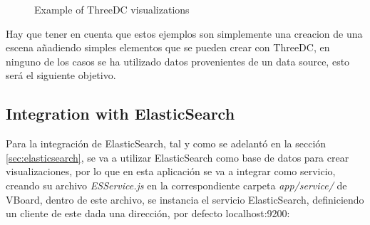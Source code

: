 \documentclass[a4paper, 12pt]{book}
\begin{document}
\begin{figure}[H]
 \centering
 \caption{Example of ThreeDC visualizations}
 \label{f:threedcexamples}
\end{figure}

Hay que tener en cuenta que estos ejemplos son simplemente una creacion de una escena añadiendo simples elementos que se pueden crear con ThreeDC, en ninguno de los casos se ha utilizado datos provenientes de un data source, esto será el siguiente objetivo.



\subsection{Integration with ElasticSearch}

Para la integración de ElasticSearch, tal y como se adelantó en la sección \ref{sec:elasticsearch}, se va a utilizar ElasticSearch como base de datos para crear visualizaciones, por lo que en esta aplicación se va a integrar como servicio, creando su archivo \textit{ESService.js} en la correspondiente carpeta \textit{app/service/} de VBoard, dentro de este archivo, se instancia el servicio ElasticSearch, definiciendo un cliente de este dada una dirección, por defecto localhost:9200:
\end{document}
